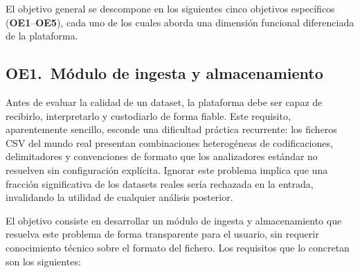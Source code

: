 El objetivo general se descompone en los siguientes cinco objetivos específicos
(\textbf{OE1}--\textbf{OE5}), cada uno de los cuales aborda una dimensión
funcional diferenciada de la plataforma.


\subsection{OE1.\ Módulo de ingesta y almacenamiento}
\label{sec:oe1}

Antes de evaluar la calidad de un dataset, la plataforma debe ser capaz de
recibirlo, interpretarlo y custodiarlo de forma fiable.  Este requisito,
aparentemente sencillo, esconde una dificultad práctica recurrente: los
ficheros \ac{CSV} del mundo real presentan combinaciones heterogéneas de
codificaciones, delimitadores y convenciones de formato que los analizadores
estándar no resuelven sin configuración explícita.  Ignorar este problema
implica que una fracción significativa de los datasets reales sería rechazada
en la entrada, invalidando la utilidad de cualquier análisis posterior.

El objetivo consiste en desarrollar un módulo de ingesta y almacenamiento que
resuelva este problema de forma transparente para el usuario, sin requerir
conocimiento técnico sobre el formato del fichero.  Los requisitos que lo
concretan son los siguientes:

